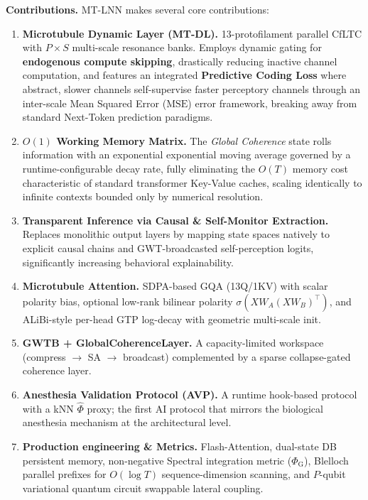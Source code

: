\documentclass[11pt]{article}
\theoremstyle{definition}
\newcommand{\sigmoid}{\sigma}
\newcommand{\phihat}{\hat{\Phi}}
\newcommand{\phig}{\Phi_{\mathrm{G}}}
\begin{document}
\medskip\noindent\textbf{Contributions.} MT-LNN makes several core contributions:
\begin{enumerate}[label=\textbf{C\arabic*},leftmargin=*]
  \item \textbf{Microtubule Dynamic Layer (MT-DL).} 13-protofilament parallel CfLTC with $P\!\times\!S$ multi-scale resonance banks. Employs dynamic gating for \textbf{endogenous compute skipping}, drastically reducing inactive channel computation, and features an integrated \textbf{Predictive Coding Loss} where abstract, slower channels self-supervise faster perceptory channels through an inter-scale Mean Squared Error ($\mathrm{MSE}$) error framework, breaking away from standard Next-Token prediction paradigms.
  \item \textbf{$O(1)$ Working Memory Matrix.} The \emph{Global Coherence} state rolls information with an exponential exponential moving average governed by a runtime-configurable decay rate, fully eliminating the $O(T)$ memory cost characteristic of standard transformer Key-Value caches, scaling identically to infinite contexts bounded only by numerical resolution.
  \item \textbf{Transparent Inference via Causal \& Self-Monitor Extraction.} Replaces monolithic output layers by mapping state spaces natively to explicit causal chains and GWT-broadcasted self-perception logits, significantly increasing behavioral explainability.
  \item \textbf{Microtubule Attention.} SDPA-based GQA (13Q/1KV) with scalar polarity bias, optional low-rank bilinear polarity $\sigmoid(XW_A(XW_B)^\top)$, and ALiBi-style per-head GTP log-decay with geometric multi-scale init.
  \item \textbf{GWTB + GlobalCoherenceLayer.} A capacity-limited workspace (compress $\to$ SA $\to$ broadcast) complemented by a sparse collapse-gated coherence layer.
  \item \textbf{Anesthesia Validation Protocol (AVP).} A runtime hook-based protocol with a kNN $\phihat$ proxy; the first AI protocol that mirrors the biological anesthesia mechanism at the architectural level.
  \item \textbf{Production engineering \& Metrics.} Flash-Attention, dual-state DB persistent memory, non-negative Spectral integration metric ($\phig$), Blelloch parallel prefixes for $O(\log T)$ sequence-dimension scanning, and $P$-qubit variational quantum circuit swappable lateral coupling.
\end{enumerate}
\end{document}

